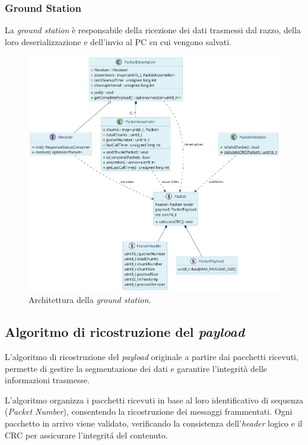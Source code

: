 \documentclass[12pt,a4paper,twoside]{book}
\begin{document}
\subsubsection{Ground Station}
La \emph{ground station} è responsabile della ricezione dei dati trasmessi dal
razzo, della loro deserializzazione e dell'invio al PC su cui vengono salvati.
\begin{figure}[H]
    \centering
    \includegraphics[width=\textwidth]{img/uml/ground-station.png}
    \caption{Architettura della \emph{ground station}.}
    \label{fig:ground-station-architecture}
\end{figure}
\newpage
\subsection{Algoritmo di ricostruzione del \emph{payload}} \label{sec:reconstruction-algorithm}
L'algoritmo di ricostruzione del \emph{payload} originale a partire dai pacchetti
ricevuti, permette di gestire la segmentazione dei dati e garantire l'integrità
delle informazioni trasmesse.

L'algoritmo organizza i pacchetti ricevuti in base al loro identificativo di sequenza
(\emph{Packet Number}), consentendo la ricostruzione dei messaggi frammentati.
Ogni pacchetto in arrivo viene validato, verificando la consistenza dell'\emph{header} logico
e il \ac{CRC} per assicurare l'integrit\'a del contenuto.
\end{document}
